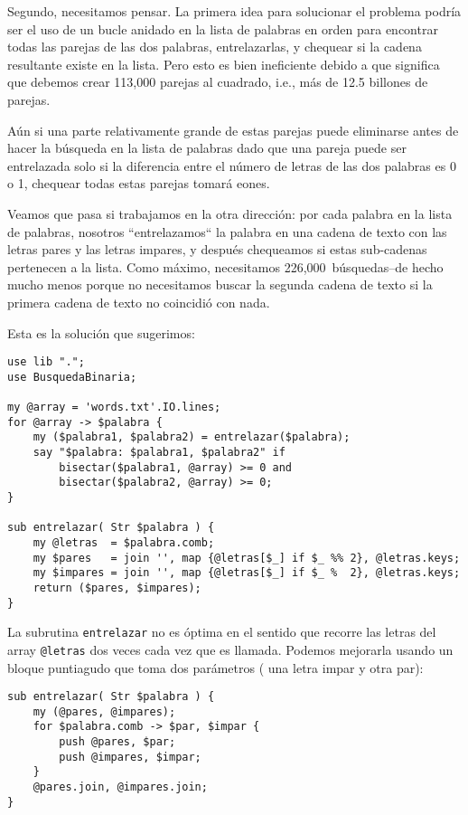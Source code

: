 Segundo, necesitamos pensar. La primera idea para solucionar
el problema podría ser el uso de un bucle anidado en la lista
de palabras en orden para encontrar todas las parejas de 
las dos palabras, entrelazarlas, y chequear si la cadena
resultante existe en la lista. Pero esto es bien ineficiente
debido a que significa que debemos crear 113,000 parejas 
al cuadrado, i.e., más de 12.5 billones de parejas.

Aún si una parte relativamente grande de estas parejas
puede eliminarse antes de hacer la búsqueda en la lista de
palabras dado que una pareja puede ser entrelazada solo si
la diferencia entre el número de letras de las dos palabras
es 0 o 1, chequear todas estas parejas tomará eones.


Veamos que pasa si trabajamos en la otra dirección: por cada
palabra en la lista de palabras, nosotros ``entrelazamos``
la palabra en una cadena de texto con las letras pares y las
letras impares, y después chequeamos si estas sub-cadenas pertenecen
a la lista. Como máximo, necesitamos 226,000~búsquedas--de hecho 
mucho menos porque no necesitamos buscar la segunda cadena de 
texto si la primera cadena de texto no coincidió con nada.

Esta es la solución que sugerimos:
\begin{verbatim}
use lib ".";
use BusquedaBinaria;

my @array = 'words.txt'.IO.lines;
for @array -> $palabra {
    my ($palabra1, $palabra2) = entrelazar($palabra);
    say "$palabra: $palabra1, $palabra2" if 
        bisectar($palabra1, @array) >= 0 and 
        bisectar($palabra2, @array) >= 0;
}

sub entrelazar( Str $palabra ) {
    my @letras  = $palabra.comb;
    my $pares   = join '', map {@letras[$_] if $_ %% 2}, @letras.keys;
    my $impares = join '', map {@letras[$_] if $_ %  2}, @letras.keys;
    return ($pares, $impares);
}
\end{verbatim}

La subrutina {\tt entrelazar} no es óptima en el 
sentido que recorre las letras del array \verb|@letras| 
dos veces cada vez que es llamada. Podemos mejorarla
usando un bloque puntiagudo que toma dos parámetros (
una letra impar y otra par):

\begin{verbatim}
sub entrelazar( Str $palabra ) {
    my (@pares, @impares);
    for $palabra.comb -> $par, $impar {
        push @pares, $par;
        push @impares, $impar;
    }
    @pares.join, @impares.join;
}
\end{verbatim}

